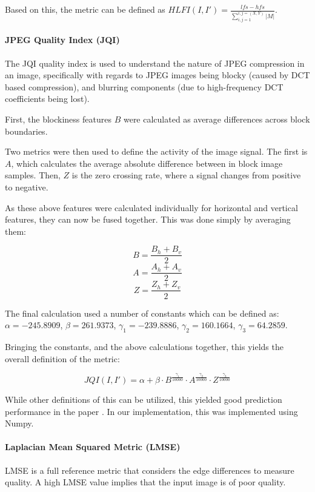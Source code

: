 \documentclass[10pt,a4paper]{article}
\begin{document}
                Based on this, the metric can be defined as $HLFI(I, I') = \frac{lfs - hfs}{\sum_{i,j = 1}^{i,j = (X, Y)} |M|}$.
                
            \paragraph{JPEG Quality Index (JQI)}
                The JQI quality index is used to understand the nature of JPEG compression in an image, specifically with regards to JPEG images being blocky (caused by DCT based compression),
                and blurring components (due to high-frequency DCT coefficients being lost).

                First, the blockiness features $B$ were calculated as average differences across block boundaries. 
                
                Two metrics were then used to define the activity of the image signal. The first is $A$, which calculates the average absolute difference between in block image samples.
                Then, $Z$ is the zero crossing rate, where a signal changes from positive to negative.

                As these above features were calculated individually for horizontal and vertical features, they can now be fused together. This was done simply by averaging them:

                $$B = \frac{B_h + B_v}{2}$$
                $$A = \frac{A_h + A_v}{2}$$
                $$Z = \frac{Z_h + Z_v}{2}$$

                The final calculation used a number of constants which can be defined as:
                $\alpha = -245.8909$, $\beta = 261.9373$, $\gamma_1 = -239.8886$, $\gamma_2 = 160.1664$, $\gamma_3 = 64.2859$.

                Bringing the constants, and the above calculations together, this yields the overall definition of the metric:

                $$JQI(I, I') = \alpha + \beta \cdot B ^{\frac{\gamma_1}{10000}} \cdot A^{\frac{\gamma_2}{10000}} \cdot Z^{\frac{\gamma_3}{10000}}$$

                While other definitions of this can be utilized, this yielded good prediction performance in the paper \cite{JQIPaper}. In our implementation, this was implemented using 
                Numpy.
            \paragraph{Laplacian Mean Squared Metric (LMSE)}
                LMSE is a full reference metric that considers the edge differences to measure quality. A high LMSE value implies that the input image is of poor quality. 
                    
\end{document}
